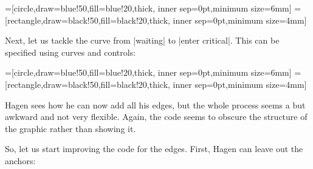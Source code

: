 {
=[circle,draw=blue!50,fill=blue!20,thick,
                   inner sep=0pt,minimum size=6mm]
=[rectangle,draw=black!50,fill=black!20,thick,
                        inner sep=0pt,minimum size=4mm]
\begin{codeexample}[]
\end{codeexample}
}

Next, let us tackle the curve from |waiting| to |enter critical|. This
can be specified using curves and controls:

{
=[circle,draw=blue!50,fill=blue!20,thick,
                   inner sep=0pt,minimum size=6mm]
=[rectangle,draw=black!50,fill=black!20,thick,
                        inner sep=0pt,minimum size=4mm]
\begin{codeexample}[]
\end{codeexample}
}

Hagen sees how he can now add all his edges, but the whole process
seems a but awkward and not very flexible. Again, the code seems to
obscure the structure of the graphic rather than showing it.

So, let us start improving the code for the edges. First, Hagen can
leave out the anchors:

